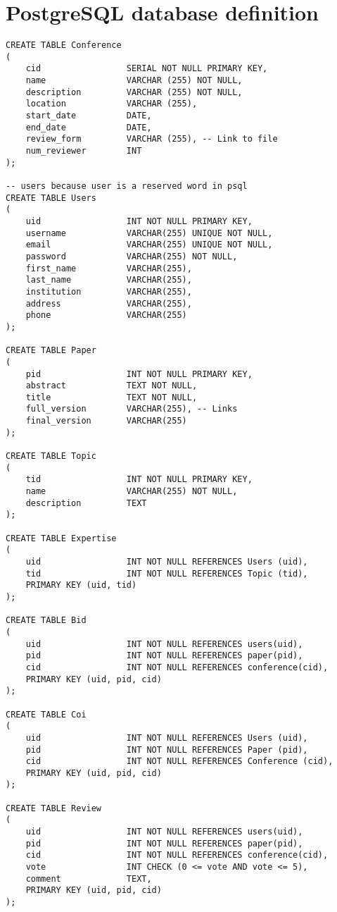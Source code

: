 \documentclass[12pt]{article}
\newcommand{\<}{\langle}
\renewcommand{\>}{\rangle}
\begin{document}
\part{PostgreSQL database definition}

\begin{verbatim}
CREATE TABLE Conference
(
    cid                 SERIAL NOT NULL PRIMARY KEY,
    name                VARCHAR (255) NOT NULL,
    description         VARCHAR (255) NOT NULL,
    location            VARCHAR (255),
    start_date          DATE,
    end_date            DATE,
    review_form         VARCHAR (255), -- Link to file
    num_reviewer        INT
);

-- users because user is a reserved word in psql
CREATE TABLE Users 
(
    uid                 INT NOT NULL PRIMARY KEY,
    username            VARCHAR(255) UNIQUE NOT NULL,
    email               VARCHAR(255) UNIQUE NOT NULL,
    password            VARCHAR(255) NOT NULL,
    first_name          VARCHAR(255),
    last_name           VARCHAR(255),
    institution         VARCHAR(255),
    address             VARCHAR(255),
    phone               VARCHAR(255)
);

CREATE TABLE Paper 
(
    pid                 INT NOT NULL PRIMARY KEY,
    abstract            TEXT NOT NULL,
    title               TEXT NOT NULL,
    full_version        VARCHAR(255), -- Links
    final_version       VARCHAR(255)
);

CREATE TABLE Topic 
(
    tid                 INT NOT NULL PRIMARY KEY,
    name                VARCHAR(255) NOT NULL,
    description         TEXT
);

CREATE TABLE Expertise 
(
    uid                 INT NOT NULL REFERENCES Users (uid),
    tid                 INT NOT NULL REFERENCES Topic (tid),
    PRIMARY KEY (uid, tid)
);

CREATE TABLE Bid 
(
    uid                 INT NOT NULL REFERENCES users(uid),
    pid                 INT NOT NULL REFERENCES paper(pid),
    cid                 INT NOT NULL REFERENCES conference(cid),
    PRIMARY KEY (uid, pid, cid)
);

CREATE TABLE Coi
(
    uid                 INT NOT NULL REFERENCES Users (uid),
    pid                 INT NOT NULL REFERENCES Paper (pid),
    cid                 INT NOT NULL REFERENCES Conference (cid),
    PRIMARY KEY (uid, pid, cid)
);

CREATE TABLE Review 
(
    uid                 INT NOT NULL REFERENCES users(uid),
    pid                 INT NOT NULL REFERENCES paper(pid),
    cid                 INT NOT NULL REFERENCES conference(cid),
    vote                INT CHECK (0 <= vote AND vote <= 5),
    comment             TEXT,
    PRIMARY KEY (uid, pid, cid)
);


\end{verbatim}
\end{document}
